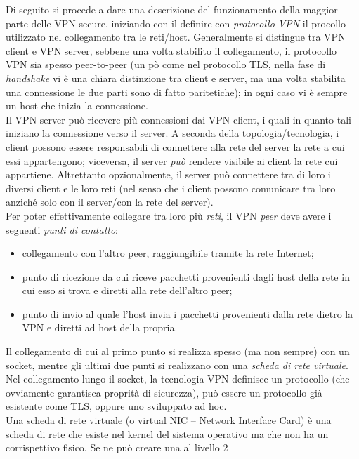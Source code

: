Di seguito si procede a dare una descrizione del funzionamento della maggior parte
delle VPN secure, iniziando con il definire con \textit{protocollo VPN}
il procollo utilizzato nel collegamento tra le reti/host.
Generalmente si distingue tra VPN client e VPN server, sebbene
una volta stabilito il collegamento, il protocollo VPN sia spesso peer-to-peer (un
pò come nel protocollo TLS, nella fase di \textit{handshake} vi è una chiara distinzione
tra client e server, ma una volta stabilita una connessione le due parti sono di fatto
paritetiche); in ogni caso vi è sempre un host che inizia la connessione.\\
Il VPN server può ricevere più connessioni dai VPN client, i quali in quanto tali
iniziano la connessione verso il server. A seconda della topologia/tecnologia,
i client possono essere responsabili di connettere alla rete del server la rete
a cui essi appartengono; viceversa, il server \textit{può} rendere visibile ai client
la rete cui appartiene. Altrettanto opzionalmente,
il server può connettere tra di loro i diversi client e le loro reti (nel senso che
i client possono comunicare tra loro anziché solo con il server/con la rete del server).\\
Per poter effettivamente collegare tra loro più \textit{reti}, il VPN \textit{peer}
deve avere i seguenti \textit{punti di contatto}:
\begin{itemize}
  \item collegamento con l'altro peer, raggiungibile tramite la rete Internet;
  \item punto di ricezione da cui riceve pacchetti provenienti dagli host della
  rete in cui esso si trova e diretti alla rete dell'altro peer;
  \item punto di invio al quale l'host invia i pacchetti provenienti dalla rete dietro
  la VPN
  e diretti ad host della propria.
\end{itemize}
Il collegamento di cui al primo punto si realizza spesso (ma non sempre) con un socket,
mentre gli ultimi due punti si realizzano con una \textit{scheda di rete virtuale}.\\
Nel collegamento lungo il socket, la tecnologia VPN definisce un protocollo (che ovviamente
garantisca proprità di sicurezza), può essere un protocollo già esistente come TLS,
oppure uno sviluppato ad hoc.\\
Una scheda di rete virtuale (o virtual NIC -- Network Interface Card) è una
scheda di rete che esiste nel kernel del sistema
operativo ma che non ha un corrispettivo fisico. Se ne può creare una al livello 2
